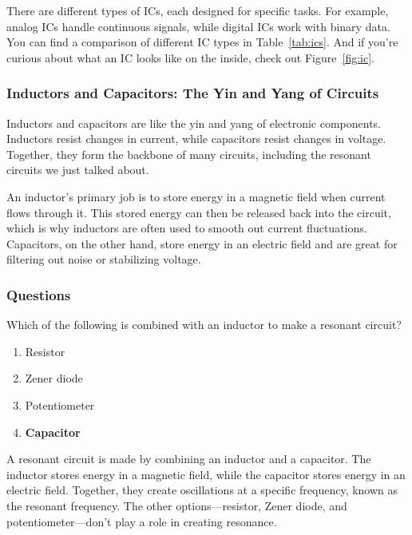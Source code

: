 There are different types of ICs, each designed for specific tasks. For example, analog ICs handle continuous signals, while digital ICs work with binary data. You can find a comparison of different IC types in Table~\ref{tab:ics}. And if you’re curious about what an IC looks like on the inside, check out Figure~\ref{fig:ic}.

\subsubsection*{Inductors and Capacitors: The Yin and Yang of Circuits}
Inductors and capacitors are like the yin and yang of electronic components. Inductors resist changes in current, while capacitors resist changes in voltage. Together, they form the backbone of many circuits, including the resonant circuits we just talked about.

An inductor’s primary job is to store energy in a magnetic field when current flows through it. This stored energy can then be released back into the circuit, which is why inductors are often used to smooth out current fluctuations. Capacitors, on the other hand, store energy in an electric field and are great for filtering out noise or stabilizing voltage.

\subsubsection*{Questions}
\begin{tcolorbox}[colback=gray!10!white,colframe=black!75!black,title={T6D08}]
Which of the following is combined with an inductor to make a resonant circuit?
\begin{enumerate}[label=\Alph*),noitemsep]
    \item Resistor
    \item Zener diode
    \item Potentiometer
    \item \textbf{Capacitor}
\end{enumerate}
\end{tcolorbox}
A resonant circuit is made by combining an inductor and a capacitor. The inductor stores energy in a magnetic field, while the capacitor stores energy in an electric field. Together, they create oscillations at a specific frequency, known as the resonant frequency. The other options—resistor, Zener diode, and potentiometer—don’t play a role in creating resonance.

